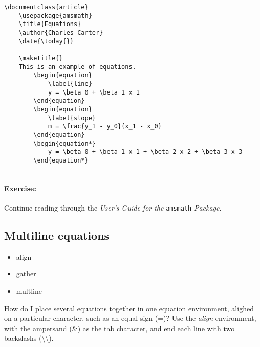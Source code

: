         \begin{verbatim}
\documentclass{article}
	\usepackage{amsmath}
    \title{Equations}
    \author{Charles Carter}
    \date{\today{}}
 
    \maketitle{}
	This is an example of equations.
		\begin{equation}
			\label{line}
			y = \beta_0 + \beta_1 x_1
		\end{equation}
		\begin{equation}
			\label{slope}
			m = \frac{y_1 - y_0}{x_1 - x_0}
		\end{equation}
		\begin{equation*}
			y = \beta_0 + \beta_1 x_1 + \beta_2 x_2 + \beta_3 x_3
		\end{equation*}
	    
        \end{verbatim}

		\paragraph{Exercise:}Continue reading through the \textit{User's Guide for the }\texttt{amsmath} \textit{Package}.

        \subsection{Multiline equations}
        \label{Multiline equations}
        
        \begin{framed}
            \begin{itemize}
                \item{align}
                \item{gather}
                \item{multline}
            \end{itemize}
        \end{framed}

		How do I place several equations together in one equation environment, alighed on a particular character, such as an equal sign (=)? Use the \textit{align} environment, with the ampersand (\&) as the tab character, and end each line with two backslashs (\textbackslash{}\textbackslash{}).

